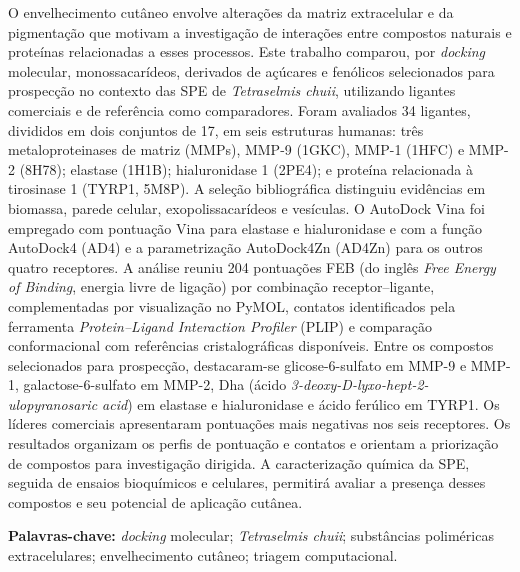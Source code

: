 \begingroup
\singlespacing
\noindent
O envelhecimento cutâneo envolve alterações da matriz extracelular e da pigmentação que motivam a investigação de interações entre compostos naturais e proteínas relacionadas a esses processos. Este trabalho comparou, por \textit{docking} molecular, monossacarídeos, derivados de açúcares e fenólicos selecionados para prospecção no contexto das SPE de \textit{Tetraselmis chuii}, utilizando ligantes comerciais e de referência como comparadores. Foram avaliados 34 ligantes, divididos em dois conjuntos de 17, em seis estruturas humanas: três metaloproteinases de matriz (MMPs), MMP-9 (1GKC), MMP-1 (1HFC) e MMP-2 (8H78); elastase (1H1B); hialuronidase 1 (2PE4); e proteína relacionada à tirosinase 1 (TYRP1, 5M8P). A seleção bibliográfica distinguiu evidências em biomassa, parede celular, exopolissacarídeos e vesículas. O AutoDock Vina foi empregado com pontuação Vina para elastase e hialuronidase e com a função AutoDock4 (AD4) e a parametrização AutoDock4Zn (AD4Zn) para os outros quatro receptores. A análise reuniu 204 pontuações FEB (do inglês \textit{Free Energy of Binding}, energia livre de ligação) por combinação receptor--ligante, complementadas por visualização no PyMOL, contatos identificados pela ferramenta \textit{Protein--Ligand Interaction Profiler} (PLIP) e comparação conformacional com referências cristalográficas disponíveis. Entre os compostos selecionados para prospecção, destacaram-se glicose-6-sulfato em MMP-9 e MMP-1, galactose-6-sulfato em MMP-2, Dha (ácido \textit{3-deoxy-D-lyxo-hept-2-ulopyranosaric acid}) em elastase e hialuronidase e ácido ferúlico em TYRP1. Os líderes comerciais apresentaram pontuações mais negativas nos seis receptores. Os resultados organizam os perfis de pontuação e contatos e orientam a priorização de compostos para investigação dirigida. A caracterização química da SPE, seguida de ensaios bioquímicos e celulares, permitirá avaliar a presença desses compostos e seu potencial de aplicação cutânea.

\vspace{\baselineskip}
\noindent\textbf{Palavras-chave:} \textit{docking} molecular; \textit{Tetraselmis chuii}; substâncias poliméricas extracelulares; envelhecimento cutâneo; triagem computacional.
\endgroup
